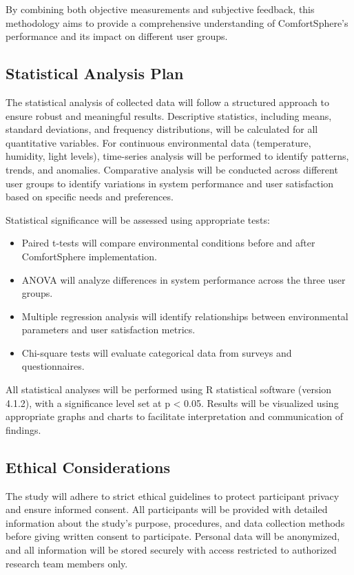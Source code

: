 \documentclass[a4paper]{scrartcl}
\begin{document}
	By combining both objective measurements and subjective feedback, this methodology aims to provide a comprehensive understanding of ComfortSphere's performance and its impact on different user groups.
    
    \subsection{Statistical Analysis Plan}
    The statistical analysis of collected data will follow a structured approach to ensure robust and meaningful results. Descriptive statistics, including means, standard deviations, and frequency distributions, will be calculated for all quantitative variables. For continuous environmental data (temperature, humidity, light levels), time-series analysis will be performed to identify patterns, trends, and anomalies. Comparative analysis will be conducted across different user groups to identify variations in system performance and user satisfaction based on specific needs and preferences.
    
    Statistical significance will be assessed using appropriate tests:
    \begin{itemize}
        \item Paired t-tests will compare environmental conditions before and after ComfortSphere implementation.
        \item ANOVA will analyze differences in system performance across the three user groups.
        \item Multiple regression analysis will identify relationships between environmental parameters and user satisfaction metrics.
        \item Chi-square tests will evaluate categorical data from surveys and questionnaires.
    \end{itemize}
    
    All statistical analyses will be performed using R statistical software (version 4.1.2), with a significance level set at p < 0.05. Results will be visualized using appropriate graphs and charts to facilitate interpretation and communication of findings.
    
    \subsection{Ethical Considerations}
    The study will adhere to strict ethical guidelines to protect participant privacy and ensure informed consent. All participants will be provided with detailed information about the study's purpose, procedures, and data collection methods before giving written consent to participate. Personal data will be anonymized, and all information will be stored securely with access restricted to authorized research team members only.
    
\end{document}

